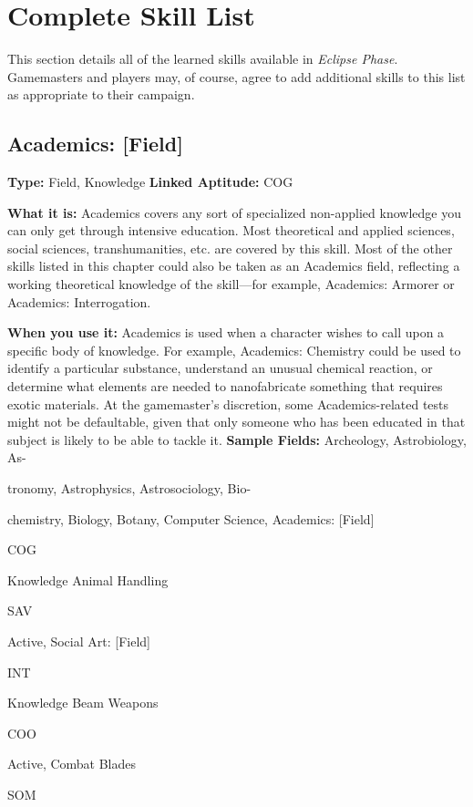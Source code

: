 \section{Complete Skill List}

This section details all of the learned skills available
in \textit{Eclipse Phase}. Gamemasters and players
may, of course, agree to add additional skills to 
this list as appropriate to their campaign.

\subsection{Academics: [Field]}

\textbf{Type:} Field, Knowledge
\textbf{Linked Aptitude:} COG

\textbf{What it is:} Academics covers any sort of specialized
non-applied knowledge you can only get
through intensive education. Most theoretical and 
applied sciences, social sciences, transhumanities, 
etc. are covered by this skill. Most of the other 
skills listed in this chapter could also be taken as 
an Academics field, reflecting a working theoretical 
knowledge of the skill—for example, Academics: 
Armorer or Academics: Interrogation.

\textbf{When you use it:} Academics is used when a 
character wishes to call upon a specific body of 
knowledge. For example, Academics: Chemistry 
could be used to identify a particular substance, 
understand an unusual chemical reaction, or determine
what elements are needed to nanofabricate
something that requires exotic materials. At the 
gamemaster's discretion, some Academics-related 
tests might not be defaultable, given that only 
someone who has been educated in that subject is 
likely to be able to tackle it.
\textbf{Sample Fields:} Archeology, Astrobiology, As-

tronomy, Astrophysics, Astrosociology, Bio-

chemistry, Biology, Botany, Computer Science, 
Academics: [Field]

COG

Knowledge
Animal Handling

SAV

Active, Social
Art: [Field]

INT

Knowledge
Beam Weapons

COO

Active, Combat
Blades

SOM


